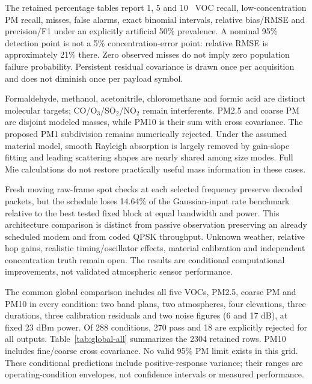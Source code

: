 The retained percentage tables report 1, 5 and 10 \ugm\ VOC recall, low-concentration PM recall, misses, false alarms, exact binomial intervals, relative bias/RMSE and precision/F1 under an explicitly artificial 50\% prevalence. A nominal 95\% detection point is not a 5\% concentration-error point: relative RMSE is approximately 21\% there. Zero observed misses do not imply zero population failure probability. Persistent residual covariance is drawn once per acquisition and does not diminish once per payload symbol.

Formaldehyde, methanol, acetonitrile, chloromethane and formic acid are distinct molecular targets; CO/O$_3$/SO$_2$/NO$_2$ remain interferents. PM2.5 and coarse PM are disjoint modeled masses, while PM10 is their sum with cross covariance. The proposed PM1 subdivision remains numerically rejected. Under the assumed material model, smooth Rayleigh absorption is largely removed by gain-slope fitting and leading scattering shapes are nearly shared among size modes. Full Mie calculations do not restore practically useful mass information in these cases.

Fresh moving raw-frame spot checks at each selected frequency preserve decoded packets, but the schedule loses 14.64\% of the Gaussian-input rate benchmark relative to the best tested fixed block at equal bandwidth and power. This architecture comparison is distinct from passive observation preserving an already scheduled modem and from coded QPSK throughput. Unknown weather, relative hop gains, realistic timing/oscillator effects, material calibration and independent concentration truth remain open. The results are conditional computational improvements, not validated atmospheric sensor performance.

The common global comparison includes all five VOCs, PM2.5, coarse PM and PM10 in every condition: two band plans, two atmospheres, four elevations, three durations, three calibration residuals and two noise figures (6 and 17 dB), at fixed 23 dBm power. Of 288 conditions, 270 pass and 18 are explicitly rejected for all outputs. Table~\ref{tab:global-all} summarizes the 2304 retained rows. PM10 includes fine/coarse cross covariance. No valid 95\% PM limit exists in this grid. These conditional predictions include positive-response variance; their ranges are operating-condition envelopes, not confidence intervals or measured performance.

